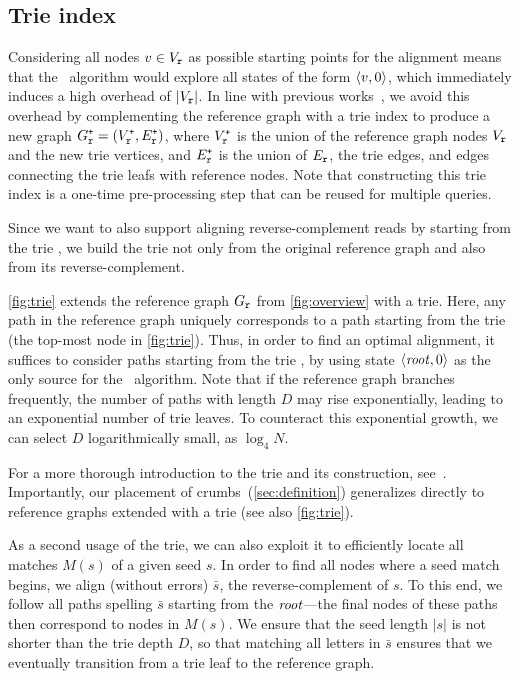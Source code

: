 

\subsection{Trie index} \label{sec:trie}
%
Considering all nodes $v \in V_\texttt{r}$ as possible starting points for the alignment
means that the \A~algorithm would explore all states of the form $\langle v, 0 \rangle$,
which immediately induces a high overhead of $\lvert V_\texttt{r} \rvert$.
%
In line with previous works~\citep{ivanov2020astarix,dox2018efficient}, we avoid
this overhead by complementing the reference graph with a trie index to produce
a new graph $G_\texttt{r}^\texttt{+} = (V_\texttt{r}^\texttt{+}, E_\texttt{r}^\texttt{+})$, where $V_\texttt{r}^\texttt{+}$ is the union of the reference
graph nodes $V_\texttt{r}$ and the new trie vertices, and $E_\texttt{r}^\texttt{+}$ is the union of $E_\texttt{r}$,
the trie edges, and edges connecting the trie leafs with reference nodes. Note
that constructing this trie index is a one-time pre-processing step that can be
reused for multiple queries.

Since we want to also support aligning reverse-complement reads by starting from
the trie \trieroot{}, we build the trie not only from the original reference
graph and also from its reverse-complement.

%
\cref{fig:trie} extends the reference graph $G_\texttt{r}$ from \cref{fig:overview} with
a trie. Here, any path in the reference graph uniquely corresponds to a path
starting from the trie \trieroot{} (the top-most node in \cref{fig:trie}). Thus,
in order to find an optimal alignment, it suffices to consider paths starting
from the trie \trieroot{}, by using state $\langle \mathit{root}, 0 \rangle$ as the only source
for the \A~algorithm.
%
Note that if the reference graph branches frequently, the number of paths with
length $D$ may rise exponentially, leading to an exponential number of trie
leaves. To counteract this exponential growth, we can select $D$ logarithmically
small, as $\log_4N$.

For a more thorough introduction to the trie and its construction,
see~\citep{ivanov2020astarix}. Importantly, our placement of
crumbs~(\cref{sec:definition}) generalizes directly to reference graphs extended
with a trie (see also \cref{fig:trie}).


%
As a second usage of the trie, we can also exploit it to efficiently locate all
matches $M(s)$ of a given seed $s$.
%
In order to find all nodes where a seed match begins, we align (without errors)
$\bar{s}$, the reverse-complement of $s$. To this end, we follow all paths
spelling $\bar{s}$ starting from the $\mathit{root}$---the final nodes of these
paths then correspond to nodes in $M(s)$. We ensure that the seed length $|s|$
is not shorter than the trie depth $D$, so that matching all letters in
$\bar{s}$ ensures that we eventually transition from a trie leaf to the
reference graph.

